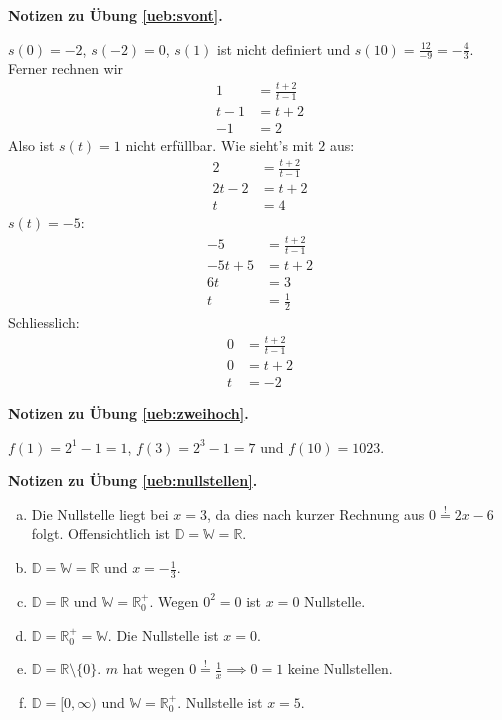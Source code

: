 \documentclass[%
11pt,%
twoside,%
titlepage,%
german,%
headsepline%
]{scrartcl}
\newcommand{\concatueb}[1]{ueb:#1}%
\newcommand{\concatlsg}[1]{lsg:#1}%
\newenvironment{lsg}[1]{%
    \par\noindent\textbf{Notizen zu Übung \ref{\concatueb{#1}}.}%
    \label{\concatlsg{#1}}
}{%
    \par%
}
\begin{document}
\begin{lsg}{svont}
	$s(0)=-2$, $s(-2)=0$, $s(1)$ ist nicht definiert und $s(10)=\frac{12}{-9}=-\frac{4}{3}$. Ferner rechnen wir
	\begin{align*}
		1 &= \frac{t+2}{t-1}\tag{$\cdot(t-1)$}\\
		t-1 &= t+2\tag{$-t$}\\
		-1 &= 2
	\end{align*}
	Also ist $s(t)=1$ nicht erf\"ullbar. Wie sieht's mit $2$ aus:
	\begin{align*}
		2 &= \frac{t+2}{t-1}\tag{$\cdot(t-1)$}\\
		2t-2 &= t+2\tag{$-t+2$}\\
		t &= 4
	\end{align*}
	$s(t)=-5:$
	\begin{align*}
		-5 &= \frac{t+2}{t-1}\tag{$\cdot(t-1)$}\\
		-5t+5 &= t+2\tag{$+5t-2$}\\
		6t &= 3\tag{$\div6$}\\
		t &= \frac{1}{2}
	\end{align*}
	Schliesslich:
	\begin{align*}
		0 &= \frac{t+2}{t-1}\tag{$\cdot(t-1)$}\\
		0 &= t+2\tag{$-2$}\\
		t &= -2
	\end{align*}
\end{lsg}
\begin{lsg}{zweihoch}
	$f(1)=2^{1}-1=1$, $f(3)=2^{3}-1=7$ und $f(10)=1023$.
\end{lsg}
\begin{lsg}{nullstellen}
	\begin{enumerate}[a)]
		\item Die Nullstelle liegt bei $x=3$, da dies nach kurzer Rechnung aus $0\stackrel{!}{=}2x-6$ folgt. Offensichtlich ist $\mathbb{D}=\mathbb{W}=\mathbb{R}$.
		\item $\mathbb{D}=\mathbb{W}=\mathbb{R}$ und $x=-\frac{1}{3}$.
		\item $\mathbb{D}=\mathbb{R}$ und $\mathbb{W}=\mathbb{R}^{+}_{0}$. Wegen $0^{2}=0$ ist $x=0$ Nullstelle.
		\item $\mathbb{D}=\mathbb{R}^{+}_{0}=\mathbb{W}$. Die Nullstelle ist $x=0$.
		\item $\mathbb{D}=\mathbb{R}\setminus\{0\}$. $m$ hat wegen $0\stackrel{!}{=}\frac{1}{x}\implies0=1$ keine Nullstellen.
		\item $\mathbb{D}=[0,\infty)$ und $\mathbb{W}=\mathbb{R}^{+}_{0}$. Nullstelle ist $x=5$.
	\end{enumerate}
\end{lsg}
\end{document}
